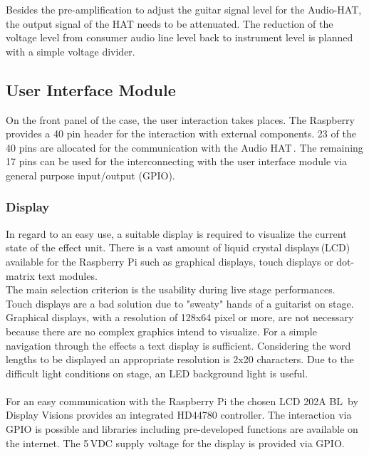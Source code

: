 Besides the pre-amplification to adjust the guitar signal level for the Audio-HAT, the output signal of the HAT needs to be attenuated. The reduction of the voltage level from consumer audio line level back to instrument level is planned with a simple voltage divider.




\subsection{User Interface Module}\label{cap:designUI}

On the front panel of the case, the user interaction takes places. 
The Raspberry provides a 40 pin header for the interaction with external components.
23 of the 40 pins are allocated for the communication with the Audio HAT\,\cite[p.\,99]{Albers:2017}. The remaining 17 pins can be used for the interconnecting with the user interface module via general purpose input/output (GPIO).

\subsubsection{Display} \label{DesignDisplay}

In regard to an easy use, a suitable display is required to visualize the current state of the effect unit.
There is a vast amount of liquid crystal displays\,(LCD) available for the Raspberry Pi such as graphical displays, touch displays or dot-matrix text modules.\\
The main selection criterion is the usability during live stage performances. Touch displays are a bad solution due to "sweaty" hands of a guitarist on stage. Graphical displays, with a resolution of 128x64 pixel or more, are not necessary because there are no complex graphics intend to visualize.
For a simple navigation through the effects a text display is sufficient.
Considering the word lengths to be displayed an appropriate resolution is 2x20 characters.
Due to the difficult light conditions on stage, an LED background light is useful.
\\
\\
For an easy communication with the Raspberry Pi the chosen LCD 202A BL\,\cite{LCD:2016} by Display Visions provides an integrated HD44780 controller. The interaction via GPIO is possible and libraries including pre-developed functions are available on the internet.
The 5\,VDC supply voltage for the display is provided via GPIO.

